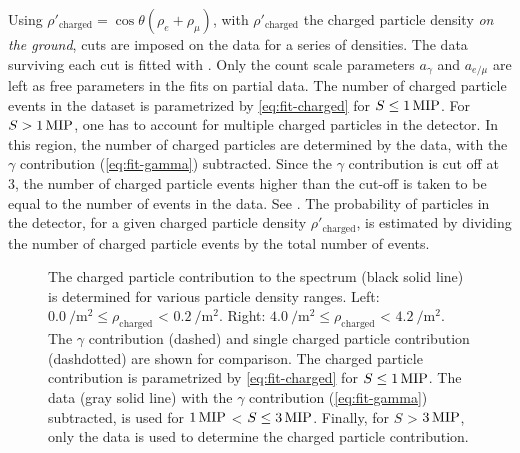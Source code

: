 Using $\rho'_\mathrm{charged} = \cos\theta (\rho_e + \rho_\mu)$, with
$\rho'_\mathrm{charged}$ the charged particle density \emph{on the ground}, cuts
are imposed on the data for a series of densities.
The data surviving each cut is fitted with
.  Only the count scale parameters
$a_\gamma$ and $a_{e/\mu}$ are left as free parameters in the fits on partial
data.  The number of charged particle events in the dataset is parametrized by
\eqref{eq:fit-charged} for $S \leq \SI{1}{\mip}$. For $S > \SI{1}{\mip}$, one
has to account for multiple charged particles in the detector. In this region,
the number of charged particles are determined by the data, with the $\gamma$
contribution (\eqref{eq:fit-gamma}) subtracted. Since the $\gamma$ contribution
is cut off at \SI{3}{\mip}, the number of charged particle events higher than
the cut-off is taken to be equal to the number of events in the data. See
.
The probability of particles in the detector, for a given charged particle
density $\rho'_\mathrm{charged}$, is estimated by dividing the number of charged
particle events by the total number of events.

\begin{figure}
\centering
{


}
\caption{The charged particle contribution to the spectrum (black solid
line) is determined for various particle density ranges.  Left:
$\SI{0.0}{\per\square\meter} \leq \rho_\mathrm{charged}$ <
$\SI{0.2}{\per\square\meter}$.  Right: $\SI{4.0}{\per\square\meter} \leq
\rho_\mathrm{charged}$ < $\SI{4.2}{\per\square\meter}$.  The $\gamma$
contribution (dashed) and single charged particle contribution
(dashdotted) are shown for comparison.  The charged particle contribution
is parametrized by \eqref{eq:fit-charged} for $S \leq \SI{1}{\mip}$. The
data (gray solid line) with the $\gamma$ contribution
(\eqref{eq:fit-gamma}) subtracted, is used for $\SI{1}{\mip}$ < $S \leq
\SI{3}{\mip}$. Finally, for $S$ > $\SI{3}{\mip}$, only the data is used to
determine the charged particle contribution.}
\label{fig:efficiency-spectrum-density-fit}
\end{figure}

